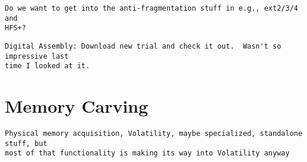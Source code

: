 \begin{Verbatim}
Do we want to get into the anti-fragmentation stuff in e.g., ext2/3/4 and 
HFS+?
\end{Verbatim}

\begin{Verbatim}
Digital Assembly: Download new trial and check it out.  Wasn't so impressive last
time I looked at it.
\end{Verbatim}

\section{Memory Carving}

\begin{Verbatim}
Physical memory acquisition, Volatility, maybe specialized, standalone stuff, but
most of that functionality is making its way into Volatility anyway
\end{Verbatim}
